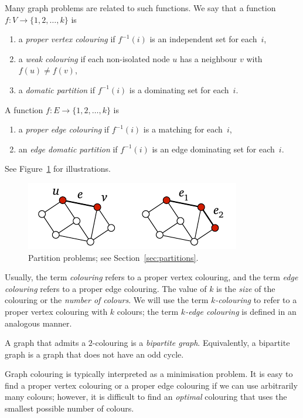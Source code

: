 Many graph problems are related to such functions. We say that a function $f\colon V \to \{1,2,\dotsc,k\}$ is
\begin{enumerate}
    \item a \emph{proper vertex colouring} if $f^{-1}(i)$ is an independent set for each~$i$,
    \item a \emph{weak colouring} if each non-isolated node $u$ has a neighbour $v$ with $f(u) \ne f(v)$,
    \item a \emph{domatic partition} if $f^{-1}(i)$ is a dominating set for each~$i$.
\end{enumerate}
A function $f\colon E \to \{1,2,\dotsc,k\}$ is
\begin{enumerate}[resume]
    \item a \emph{proper edge colouring} if $f^{-1}(i)$ is a matching for each~$i$,
    \item an \emph{edge domatic partition} if $f^{-1}(i)$ is an edge dominating set for each~$i$.
\end{enumerate}
See Figure~\ref{fig:partitions} for illustrations.
\begin{figure}
    \centering
    \includegraphics[page=\PPartitions]{figs.pdf}
    \caption{Partition problems; see Section~\ref{sec:partitions}.}\label{fig:partitions}
\end{figure}

Usually, the term \emph{colouring} refers to a proper vertex colouring, and the term \emph{edge colouring} refers to a proper edge colouring. The value of $k$ is the \emph{size} of the colouring or the \emph{number of colours}. We will use the term \emph{$k$-colouring} to refer to a proper vertex colouring with $k$ colours; the term \emph{$k$-edge colouring} is defined in an analogous manner.

A graph that admits a $2$-colouring is a \emph{bipartite graph}. Equivalently, a bipartite graph is a graph that does not have an odd cycle.

Graph colouring is typically interpreted as a minimisation problem. It is easy to find a proper vertex colouring or a proper edge colouring if we can use arbitrarily many colours; however, it is difficult to find an \emph{optimal} colouring that uses the smallest possible number of colours.

